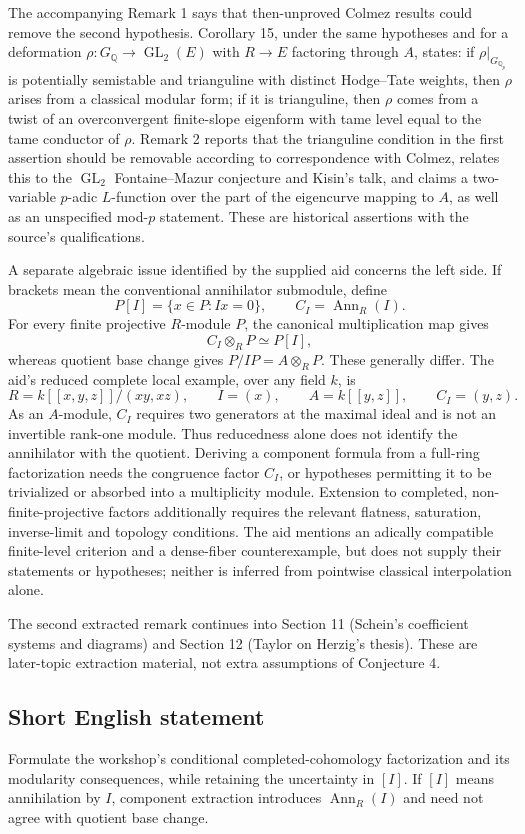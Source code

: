 \documentclass[11pt]{article}
\newcommand{\Q}{\mathbb{Q}}
\begin{document}
The accompanying Remark 1 says that then-unproved Colmez results could remove the second hypothesis. Corollary 15, under the same hypotheses and for a deformation $\rho:G_\Q\to\operatorname{GL}_2(E)$ with $R\to E$ factoring through $A$, states: if $\rho|_{G_{\Q_p}}$ is potentially semistable and trianguline with distinct Hodge--Tate weights, then $\rho$ arises from a classical modular form; if it is trianguline, then $\rho$ comes from a twist of an overconvergent finite-slope eigenform with tame level equal to the tame conductor of $\rho$. Remark 2 reports that the trianguline condition in the first assertion should be removable according to correspondence with Colmez, relates this to the $\operatorname{GL}_2$ Fontaine--Mazur conjecture and Kisin's talk, and claims a two-variable $p$-adic $L$-function over the part of the eigencurve mapping to $A$, as well as an unspecified mod-$p$ statement. These are historical assertions with the source's qualifications.

A separate algebraic issue identified by the supplied aid concerns the left side. If brackets mean the conventional annihilator submodule, define
\[
P[I]=\{x\in P:Ix=0\},\qquad C_I=\operatorname{Ann}_R(I).
\]
For every finite projective $R$-module $P$, the canonical multiplication map gives
\[
C_I\otimes_R P\simeq P[I],
\]
whereas quotient base change gives $P/IP=A\otimes_RP$. These generally differ. The aid's reduced complete local example, over any field $k$, is
\[
R=k[[x,y,z]]/(xy,xz),\qquad I=(x),\qquad
A=k[[y,z]],\qquad C_I=(y,z).
\]
As an $A$-module, $C_I$ requires two generators at the maximal ideal and is not an invertible rank-one module. Thus reducedness alone does not identify the annihilator with the quotient. Deriving a component formula from a full-ring factorization needs the congruence factor $C_I$, or hypotheses permitting it to be trivialized or absorbed into a multiplicity module. Extension to completed, non-finite-projective factors additionally requires the relevant flatness, saturation, inverse-limit and topology conditions. The aid mentions an adically compatible finite-level criterion and a dense-fiber counterexample, but does not supply their statements or hypotheses; neither is inferred from pointwise classical interpolation alone.

The second extracted remark continues into Section 11 (Schein's coefficient systems and diagrams) and Section 12 (Taylor on Herzig's thesis). These are later-topic extraction material, not extra assumptions of Conjecture 4.
\subsection{Short English statement}
Formulate the workshop's conditional completed-cohomology factorization and its modularity consequences, while retaining the uncertainty in $[I]$. If $[I]$ means annihilation by $I$, component extraction introduces $\operatorname{Ann}_R(I)$ and need not agree with quotient base change.
\end{document}
